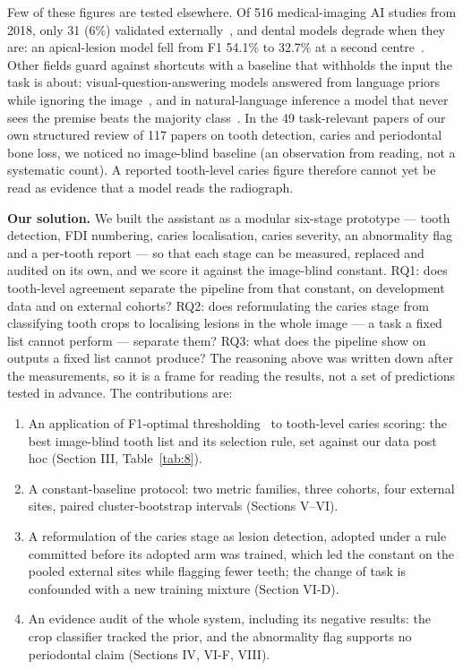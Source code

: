 \documentclass[conference]{IEEEtran}
\begin{document}
Few of these figures are tested elsewhere. Of 516 medical-imaging AI studies from 2018, only 31 (6\%) validated externally~\cite{kim2019design}, and dental models degrade when they are: an apical-lesion model fell from F1 54.1\% to 32.7\% at a second centre~\cite{krois2021generalizability}. Other fields guard against shortcuts with a baseline that withholds the input the task is about: visual-question-answering models answered from language priors while ignoring the image~\cite{goyal2017making}, and in natural-language inference a model that never sees the premise beats the majority class~\cite{poliak2018hypothesis}. In the 49 task-relevant papers of our own structured review of 117 papers on tooth detection, caries and periodontal bone loss, we noticed no image-blind baseline (an observation from reading, not a systematic count). A reported tooth-level caries figure therefore cannot yet be read as evidence that a model reads the radiograph.

\textbf{Our solution.} We built the assistant as a modular six-stage prototype — tooth detection, FDI numbering, caries localisation, caries severity, an abnormality flag and a per-tooth report — so that each stage can be measured, replaced and audited on its own, and we score it against the image-blind constant. RQ1: does tooth-level agreement separate the pipeline from that constant, on development data and on external cohorts? RQ2: does reformulating the caries stage from classifying tooth crops to localising lesions in the whole image — a task a fixed list cannot perform — separate them? RQ3: what does the pipeline show on outputs a fixed list cannot produce? The reasoning above was written down after the measurements, so it is a frame for reading the results, not a set of predictions tested in advance. The contributions are:

\begin{enumerate}
\item An application of F1-optimal thresholding~\cite{lipton2014optimal} to tooth-level caries scoring: the best image-blind tooth list and its selection rule, set against our data post hoc (Section III, Table~\ref{tab:8}).
\item A constant-baseline protocol: two metric families, three cohorts, four external sites, paired cluster-bootstrap intervals (Sections V–VI).
\item A reformulation of the caries stage as lesion detection, adopted under a rule committed before its adopted arm was trained, which led the constant on the pooled external sites while flagging fewer teeth; the change of task is confounded with a new training mixture (Section VI-D).
\item An evidence audit of the whole system, including its negative results: the crop classifier tracked the prior, and the abnormality flag supports no periodontal claim (Sections IV, VI-F, VIII).
\end{enumerate}
\end{document}
